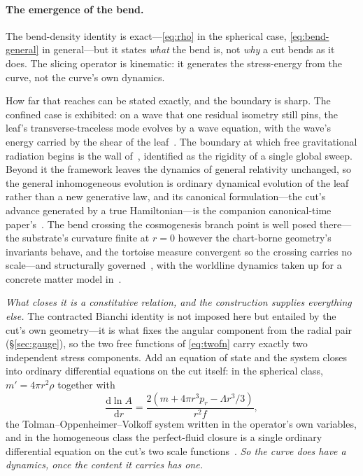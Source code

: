 \documentclass[11pt,a4paper]{article}
\theoremstyle{definition}
\newcommand{\dd}{\mathrm{d}}
\begin{document}
\paragraph{The emergence of the bend.} The bend-density identity is exact---\eqref{eq:rho} in the
spherical case, \eqref{eq:bend-general} in general---but it states \emph{what} the bend is, not
\emph{why} a cut bends as it does. The slicing operator is kinematic: it generates the stress-energy
from the curve, not the curve's own dynamics.

How far that reaches can be stated exactly, and the boundary is sharp. The confined case is
exhibited: on a wave that one residual isometry still pins, the leaf's transverse-traceless mode
evolves by a wave equation, with the wave's energy carried by the shear of the
leaf~\cite{JanzenDynamics}. The boundary at which free gravitational radiation begins is the wall
of~\cite{JanzenRange}, identified as the rigidity of a single global sweep. Beyond it the framework
leaves the dynamics of general relativity unchanged, so the general inhomogeneous evolution is
ordinary dynamical evolution of the leaf rather than a new generative law, and its canonical
formulation---the cut's advance generated by a true Hamiltonian---is the companion canonical-time
paper's~\cite{JanzenCanonicalTime}. The bend crossing the cosmogenesis branch point is well posed
there---the substrate's curvature finite at $r=0$ however the chart-borne geometry's invariants
behave, and the tortoise measure convergent so the crossing carries no scale---and structurally
governed~\cite{JanzenCRframework}, with the
worldline dynamics taken up for a concrete matter model in~\cite{JanzenCosmogenesis}.

\emph{What closes it is a constitutive relation, and the construction supplies everything else.} The
contracted Bianchi identity is not imposed here but entailed by the cut's own geometry---it is what
fixes the angular component from the radial pair (\S\ref{sec:gauge}), so the two free functions of
\eqref{eq:twofn} carry exactly two independent stress components. Add an equation of state and the
system closes into ordinary differential equations on the cut itself: in the spherical class,
$m'=4\pi r^{2}\rho$ together with
\[
  \frac{\dd\ln A}{\dd r}=\frac{2\left(m+4\pi r^{3}p_{r}-\Lambda r^{3}/3\right)}{r^{2}f},
\]
the Tolman--Oppenheimer--Volkoff system written in the operator's own
variables, and in the homogeneous class the
perfect-fluid closure is a single ordinary differential equation on the cut's two scale
functions~\cite{JanzenRange}. \emph{So the curve does have a dynamics, once the content it carries
has one.}
\end{document}
